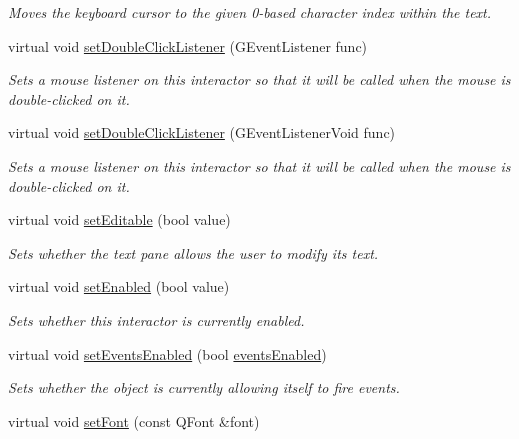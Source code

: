 \begin{DoxyCompactItemize}
\begin{DoxyCompactList}\small\item\em Moves the keyboard cursor to the given 0-\/based character index within the text. \end{DoxyCompactList}\item 
virtual void \mbox{\hyperlink{classGInteractor_ac29f9a3462458e165fae3a1f046ee77a}{set\+Double\+Click\+Listener}} (G\+Event\+Listener func)
\begin{DoxyCompactList}\small\item\em Sets a mouse listener on this interactor so that it will be called when the mouse is double-\/clicked on it. \end{DoxyCompactList}\item 
virtual void \mbox{\hyperlink{classGInteractor_a50096194d66f48c92dd4c512d41bfc76}{set\+Double\+Click\+Listener}} (G\+Event\+Listener\+Void func)
\begin{DoxyCompactList}\small\item\em Sets a mouse listener on this interactor so that it will be called when the mouse is double-\/clicked on it. \end{DoxyCompactList}\item 
virtual void \mbox{\hyperlink{classGBrowserPane_a008d7fd44fb3e7a6886cdaddbc3644a2}{set\+Editable}} (bool value)
\begin{DoxyCompactList}\small\item\em Sets whether the text pane allows the user to modify its text. \end{DoxyCompactList}\item 
virtual void \mbox{\hyperlink{classGInteractor_ab831367dd84bbd579e02e55bacb21343}{set\+Enabled}} (bool value)
\begin{DoxyCompactList}\small\item\em Sets whether this interactor is currently enabled. \end{DoxyCompactList}\item 
virtual void \mbox{\hyperlink{classGObservable_afaa30b2a9e0f378fd1c70d2f1d0b8216}{set\+Events\+Enabled}} (bool \mbox{\hyperlink{classGInteractor_a597a370b592e3737d38d9d2f4e2031ea}{events\+Enabled}})
\begin{DoxyCompactList}\small\item\em Sets whether the object is currently allowing itself to fire events. \end{DoxyCompactList}\item 
virtual void \mbox{\hyperlink{classGInteractor_a2592348886ffea646c6534bf88f7c49d}{set\+Font}} (const Q\+Font \&font)

\end{DoxyCompactItemize}

